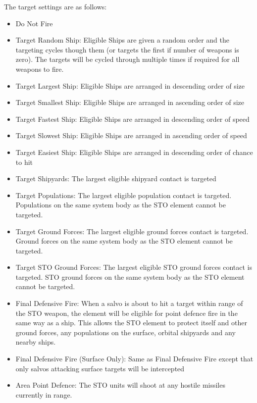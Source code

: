 \documentclass[../../Aurora C# unofficial manual.tex]{subfiles}
\begin{document}
	The target settings are as follows:
	\begin{itemize}
		\item Do Not Fire
		\item Target Random Ship:  Eligible Ships are given a random order and the targeting cycles though them (or targets the first if number of weapons is zero). The targets will be cycled through multiple times if required for all weapons to fire.
		\item Target Largest Ship:  Eligible Ships are arranged in descending order of size
		\item Target Smallest Ship:  Eligible Ships are arranged in ascending order of size
		\item Target Fastest Ship:  Eligible Ships are arranged in descending order of speed
		\item Target Slowest Ship:  Eligible Ships are arranged in ascending order of speed
		\item Target Easiest Ship:  Eligible Ships are arranged in descending order of chance to hit
		\item Target Shipyards:  The largest eligible shipyard contact is targeted
		\item Target Populations:  The largest eligible population contact is targeted. Populations on the same system body as the STO element cannot be targeted.
		\item Target Ground Forces:  The largest eligible ground forces contact is targeted. Ground forces on the same system body as the STO element cannot be targeted.
		\item Target STO Ground Forces:  The largest eligible STO ground forces contact is targeted. STO ground forces on the same system body as the STO element cannot be targeted.
		\item Final Defensive Fire:  When a salvo is about to hit a target within range of the STO weapon, the element will be eligible for point defence fire in the same way as a ship. This allows the STO element to protect itself and other ground forces, any populations on the surface, orbital shipyards and any nearby ships.
		\item Final Defensive Fire (Surface Only):  Same as Final Defensive Fire except that only salvos attacking surface targets will be intercepted
		\item Area Point Defence:  The STO units will shoot at any hostile missiles currently in range.
	\end{itemize}
\end{document}
